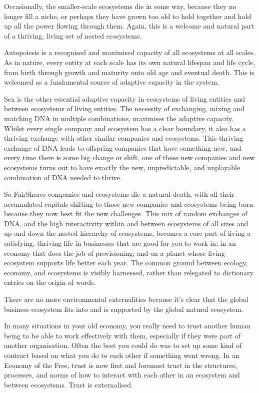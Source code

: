 Occasionally, the smaller-scale ecosystems die in some way, because they no longer fill a niche, or perhaps they have grown too old to hold together and hold up all the power flowing through them. Again, this is a welcome and natural part of a thriving, living set of nested ecosystems. 


Autopoiesis is a recognised and maximised capacity of all ecosystems at all scales. As in nature, every entity at each scale has its own natural lifespan and life cycle, from birth through growth and maturity onto old age and eventual death. This is welcomed as a fundamental source of adaptive capacity  in the system.


Sex is the other essential adaptive capacity in ecosystems of living entities and between ecosystems of living entities. The necessity of exchanging, mixing and matching DNA in multiple combinations, maximises the adaptive capacity. Whilst every single company and ecosystem has a clear boundary, it also has a thriving exchange with other similar companies and ecosystems. This thriving exchange of DNA leads to offspring companies that have something new, and every time there is some big change or shift, one of these new companies and new ecosystems turns out to have exactly the new, unpredictable, and unplayable combination of DNA needed to thrive.


So FairShares companies and ecosystems die a natural death, with all their accumulated capitals shifting to those new companies and ecosystems being born because they  now best fit the new challenges. This mix of random exchanges of DNA, and the high interactivity within and between ecosystems of all sizes and up and down the nested hierarchy of ecosystems, becomes a core part of living a satisfying, thriving life in businesses that are good for you to work in; in an economy that does the job of provisioning; and on a planet whose living ecosystem supports life better each year. The common ground between ecology, economy, and ecosystems is visibly harnessed, rather than relegated to dictionary entries on the origin of words.


There are no more environmental externalities because it's clear that the global business ecosystem fits into and is supported by the global natural ecosystem.


In many situations in your old economy, you really need to trust another human being to be able to work effectively with them, especially if they were part of another organisation. Often the best you could do was to set up some kind of contract based on what you do to each other if something went wrong. In an Economy of the Free, trust is now first and foremost trust in the structures, processes, and norms of how to interact with each other in an ecosystem and between ecosystems. Trust is externalised.


